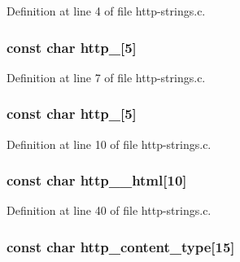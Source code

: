 Definition at line 4 of file http-\/strings.c.

\hypertarget{http-strings_8h_af9f47cee12d80f0e2b624264187fe87e}{
\subsubsection[{http\_\-301}]{\setlength{\rightskip}{0pt plus 5cm}const char {\bf http\_}\mbox{[}5\mbox{]}}}
\label{http-strings_8h_af9f47cee12d80f0e2b624264187fe87e}


Definition at line 7 of file http-\/strings.c.

\hypertarget{http-strings_8h_a274fe490acb83731df70a98d4954ad9d}{
\subsubsection[{http\_\-302}]{\setlength{\rightskip}{0pt plus 5cm}const char {\bf http\_}\mbox{[}5\mbox{]}}}
\label{http-strings_8h_a274fe490acb83731df70a98d4954ad9d}


Definition at line 10 of file http-\/strings.c.

\hypertarget{http-strings_8h_ae31e183cd9f67c1ec51663c38180b8ee}{
\subsubsection[{http\_\-404\_\-html}]{\setlength{\rightskip}{0pt plus 5cm}const char {\bf http\_\_\-html}\mbox{[}10\mbox{]}}}
\label{http-strings_8h_ae31e183cd9f67c1ec51663c38180b8ee}


Definition at line 40 of file http-\/strings.c.

\hypertarget{http-strings_8h_a1efed1f3f714de7d7748f67613286228}{
\subsubsection[{http\_\-content\_\-type}]{\setlength{\rightskip}{0pt plus 5cm}const char {\bf http\_\-content\_\-type}\mbox{[}15\mbox{]}}}
\label{http-strings_8h_a1efed1f3f714de7d7748f67613286228}


